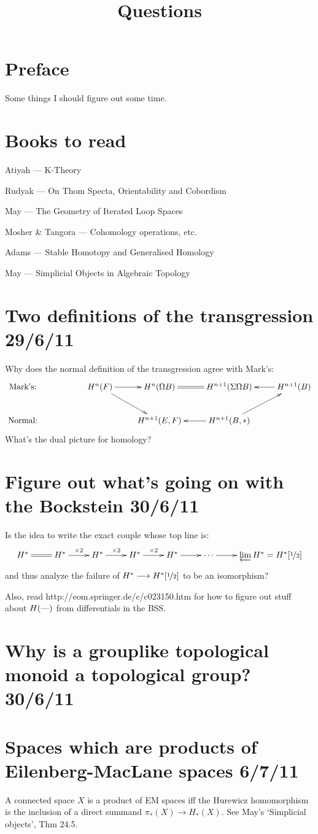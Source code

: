 \documentclass[11pt]{article}
\title{Questions}
\author{}
\date{}
\begin{document}
\newcommand{\HSsection}[2]{\section*{#1 \hfill \small{#2}}}

\HSsection{Preface}{}
Some things I should figure out some time.

\HSsection{Books to read}{}
\newcommand{\BooK}[2]{\item #1 --- #2}
\begin{itemise}
\BooK{Atiyah}{K-Theory}
\BooK{Rudyak}{On Thom Specta, Orientability and Cobordism}
\BooK{May}{The Geometry of Iterated Loop Spaces}
\BooK{Mosher \& Tangora}{Cohomology operations, etc.}
\BooK{Adams}{Stable Homotopy and Generalised Homology}
\BooK{May}{Simplicial Objects in Algebraic Topology}
\end{itemise}

\HSsection{Two definitions of the transgression}{29/6/11}
Why does the normal definition of the transgression agree with Mark's:
\[\xymatrix{
\text{Mark's:}&&\ar[dr]H^n(F)\ar[r]& H^n(\Omega B)\ar@{=}[r]&H^{n+1}(\Sigma\Omega B)&\ar[l] H^{n+1}(B)\\
\text{Normal:}&&&H^{n+1}(E,F)&H^{n+1}(B,*)\ar[ru]\ar[l]
}\]
What's the dual picture for homology?
\HSsection{Figure out what's going on with the Bockstein}{30/6/11}
Is the idea to write the exact couple whose top line is:
\[\xymatrix{
H^*\ar@{=}[r]&H^*\ar[r]^{\times2}&H^*\ar[r]^{\times2}&H^*\ar[r]^{\times2}&H^*\ar[r]&\cdots\ar[r]&\varprojlim H^*=H^*[\nicefrac{1}{2}]
}\]
and thus analyze the failure of $H^*\to H^*[\nicefrac{1}{2}]$ to be an isomorphism?

Also, read http://eom.springer.de/c/c023150.htm for how to figure out stuff about $H(\DASH)$ from differentials in the BSS.
\HSsection{Why is a grouplike topological monoid a topological group?}{30/6/11}

\HSsection{Spaces which are products of Eilenberg-MacLane spaces}{6/7/11}
A connected space $X$ is a product of EM spaces iff the Hurewicz homomorphism is the 
inclusion of a direct summand $\pi_*(X)\to H_*(X)$. See May's `Simplicial objects',
Thm 24.5.
\end{document}
